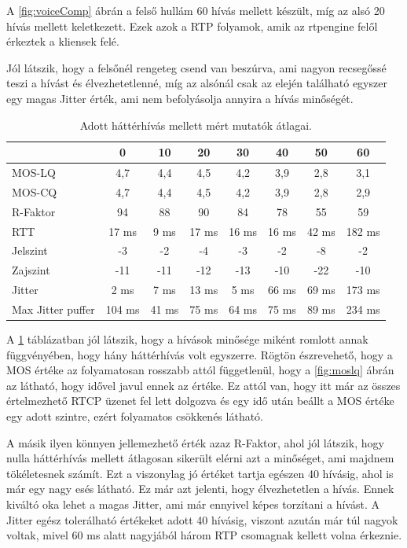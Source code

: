 A \ref{fig:voiceComp} ábrán a felső hullám 60 hívás mellett készült, míg az alsó 20 hívás 
mellett keletkezett. Ezek azok a RTP folyamok, amik az rtpengine felől érkeztek a 
kliensek felé. 

Jól látszik, hogy a felsőnél rengeteg csend van beszúrva, ami nagyon recsegőssé teszi a 
hívást és élvezhetetlenné, míg az alsónál csak az elején található egyszer egy magas 
Jitter érték, ami nem befolyásolja annyira a hívás minőségét.

\begin{table}[H]
	\footnotesize
	\centering
	\begin{tabular}{l c c c c c c c}
		\toprule
		 & 0 & 10 & 20 & 30 & 40 & 50 & 60\\
		\midrule
		MOS-LQ & 4,7 & 4,4 & 4,5 & 4,2 & 3,9 & 2,8 & 3,1\\
		MOS-CQ & 4,7 & 4,4 & 4,5 & 4,2 & 3,9 & 2,8 & 2,9\\
		R-Faktor & 94 & 88 & 90 & 84 & 78 & 55 & 59\\
		RTT & 17 ms & 9 ms & 17 ms & 16 ms & 16 ms & 42 ms & 182 ms\\
		Jelszint & -3 & -2 & -4 & -3 & -2 & -8 & -2\\
		Zajszint & -11 & -11 & -12 & -13 & -10 & -22 & -10\\
		Jitter & 2 ms & 7 ms & 13 ms & 5 ms & 66 ms & 69 ms & 173 ms\\
		Max Jitter puffer & 104 ms & 41 ms & 75 ms & 64 ms & 75 ms & 89 ms & 234 ms\\
		\bottomrule
	\end{tabular}
	\caption{Adott háttérhívás mellett mért mutatók átlagai.}
	\label{tab:callValues}
\end{table}

A \ref{tab:callValues} táblázatban jól látszik, hogy a hívások minősége miként romlott 
annak függvényében, hogy hány háttérhívás volt egyszerre. Rögtön észrevehető, hogy a 
MOS értéke az folyamatosan rosszabb attól függetlenül, hogy a \ref{fig:moslq} ábrán az 
látható, hogy idővel javul ennek az értéke. Ez attól van, hogy itt már az összes  
értelmezhető RTCP üzenet fel lett dolgozva és egy idő után beállt a MOS értéke egy adott 
szintre, ezért folyamatos csökkenés látható. 

A másik ilyen könnyen jellemezhető érték azaz R-Faktor, ahol jól látszik, hogy nulla 
háttérhívás mellett átlagosan sikerült elérni azt a minőséget, ami majdnem tökéletesnek 
számít. Ezt a viszonylag jó értéket tartja egészen 40 hívásig, ahol is már egy nagy esés 
látható. Ez már azt jelenti, hogy élvezhetetlen a hívás. Ennek kiváltó oka lehet a magas 
Jitter, ami már ennyivel képes torzítani a hívást. A Jitter egész tolerálható értékeket 
adott 40 hívásig, viszont azután már túl nagyok voltak, mivel 60 ms alatt nagyjából három 
RTP csomagnak kellett volna érkeznie.

